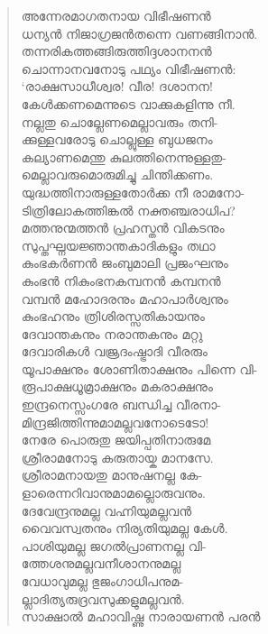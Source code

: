 \begin{verse}
അന്നേരമാഗതനായ വിഭീഷണന്‍\\
ധന്യന്‍ നിജാഗ്രജന്‍തന്നെ വണങ്ങിനാന്‍.\\
തന്നരികത്തങ്ങിരുത്തിദ്ദശാനനന്‍\\
ചൊന്നാനവനോടു പഥ്യം വിഭീഷണന്‍:\\
‘രാക്ഷസാധീശ്വര! വീര! ദശാനന!\\
കേള്‍ക്കണമെന്നുടെ വാക്കുകളിന്നു നീ.\\
നല്ലതു ചൊല്ലേണമെല്ലാവരും തനി-\\
ക്കുള്ളവരോടു ചൊല്ലുള്ള ബുധജനം\\
കല്യാണമെന്തു കുലത്തിനെന്നുള്ളതു-\\
മെല്ലാവരുമൊരുമിച്ചു ചിന്തിക്കണം.\\
യുദ്ധത്തിനാരുള്ളതോര്‍ക്ക നീ രാമനോ-\\
ടിത്രിലോകത്തിങ്കല്‍ നക്തഞ്ചരാധിപ?\\
മത്തനുന്മത്തന്‍ പ്രഹസ്തന്‍ വികടനും\\
സുപ്തഘ്നയജ്ഞാന്തകാദികളും തഥാ\\
കുംഭകര്‍ണന്‍ ജംബുമാലി പ്രജംഘനും\\
കുംഭന്‍ നികുംഭനകമ്പനന്‍ കമ്പനന്‍\\
വമ്പന്‍ മഹോദരനും മഹാപാര്‍ശ്വനും\\
കുംഭഹനും ത്രിശിരസ്സതികായനും\\
ദേവാന്തകനും നരാന്തകനും മറ്റു\\
ദേവാരികള്‍ വജ്രദംഷ്ട്രാദി വീരരും\\
യൂപാക്ഷനും ശോണിതാക്ഷനും പിന്നെ വി-\\
രൂപാക്ഷധൂമ്രാക്ഷനും മകരാക്ഷനും\\
ഇന്ദ്രനെസ്സംഗരേ ബന്ധിച്ച വീരനാ-\\
മിന്ദ്രജിത്തിന്നുമാമല്ലവനോടെടോ!\\
നേരേ പൊരുതു ജയിപ്പതിനാരുമേ\\
ശ്രീരാമനോടു കരുതായ്ക മാനസേ.\\
ശ്രീരാമനായതു മാനുഷനല്ല കേ-\\
ളാരെന്നറിവാനുമാമല്ലൊരുവനും.\\
ദേവേന്ദ്രനുമല്ല വഹ്നിയുമല്ലവന്‍\\
വൈവസ്വതനും നിര്യതിയുമല്ല കേള്‍.\\
പാശിയുമല്ല ജഗല്‍പ്രാണനല്ല വി-\\
ത്തേശനുമല്ലവനീശാനനുമല്ല\\
വേധാവുമല്ല ഭുജംഗാധിപനുമ-\\
ല്ലാദിത്യരുദ്രവസുക്കളുമല്ലവന്‍.\\
സാക്ഷാല്‍ മഹാവിഷ്ണു നാരായണന്‍ പരന്‍\\

\end{verse}

